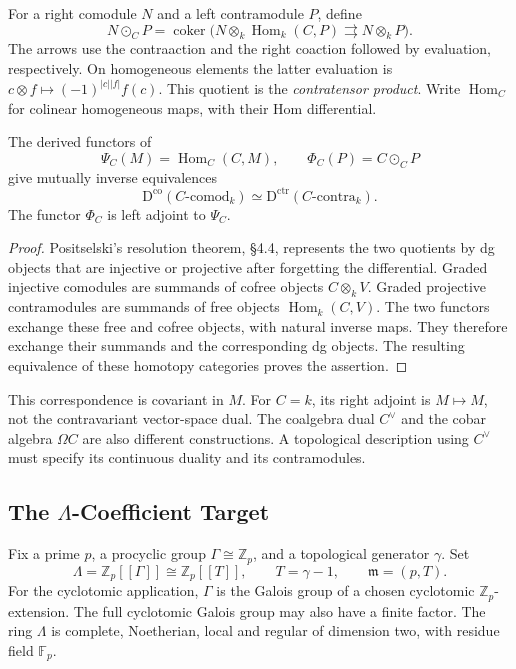 For a right comodule \(N\) and a left contramodule \(P\), define
\[
 N\odot_C P=
 \operatorname{coker}\bigl(
 N\otimes_k\operatorname{Hom}_k(C,P)
 \rightrightarrows N\otimes_k P\bigr).
\]
The arrows use the contraaction and the right coaction followed
by evaluation, respectively. On homogeneous elements the latter
evaluation is \(c\otimes f\mapsto(-1)^{|c||f|}f(c)\).
This quotient is the \emph{contratensor product}.
Write \(\operatorname{Hom}_C\) for colinear homogeneous maps,
with their Hom differential.

\begin{theorem}
\label{v4-arith:pos:thm:classical-positselski}
The derived functors of
\[
 \Psi_C(M)=\operatorname{Hom}_C(C,M),\qquad
 \Phi_C(P)=C\odot_C P
\]
give mutually inverse equivalences
\begin{equation}
\label{v4-arith:pos:eq:classical}
 \mathrm D^{\mathrm{co}}(C\text{-comod}_k)
 \simeq
 \mathrm D^{\mathrm{ctr}}(C\text{-contra}_k).
\end{equation}
The functor \(\Phi_C\) is left adjoint to \(\Psi_C\).
\end{theorem}
\begin{proof}
Positselski's resolution theorem, \S4.4, represents the two
quotients by dg objects that are injective or projective after
forgetting the differential. Graded injective comodules are
summands of cofree objects \(C\otimes_k V\). Graded projective
contramodules are summands of free objects
\(\operatorname{Hom}_k(C,V)\).
The two functors exchange these free and cofree objects, with
natural inverse maps. They therefore exchange their summands
and the corresponding dg objects. The resulting equivalence
of these homotopy categories proves the assertion.
\end{proof}

This correspondence is covariant in \(M\).
For \(C=k\), its right adjoint is \(M\mapsto M\), not the
contravariant vector-space dual. The coalgebra dual \(C^\vee\)
and the cobar algebra \(\Omega C\) are also different constructions.
A topological description using \(C^\vee\) must specify its
continuous duality and its contramodules.

\subsection{The \texorpdfstring{\(\Lambda\)}{Lambda}-Coefficient Target}
\label{v4-arith:pos:lambda-target}

Fix a prime \(p\), a procyclic group \(\Gamma\cong\mathbb Z_p\),
and a topological generator \(\gamma\). Set
\[
 \Lambda=\mathbb Z_p[[\Gamma]]\cong\mathbb Z_p[[T]],
 \qquad T=\gamma-1,\qquad \mathfrak m=(p,T).
\]
For the cyclotomic application, \(\Gamma\) is the Galois group
of a chosen cyclotomic \(\mathbb Z_p\)-extension.
The full cyclotomic Galois group may also have a finite factor.
The ring \(\Lambda\) is complete, Noetherian, local and regular
of dimension two, with residue field \(\mathbb F_p\).

